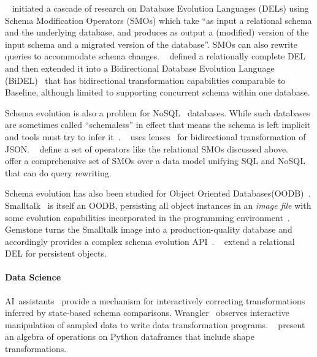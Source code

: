 \documentclass[english,submission]{programming}
\theoremstyle{definition}
\newcommand{\citet}[1]{\citeauthor*{#1}~\cite{#1}}
\begin{document}
\citet{curino08} initiated a cascade of research on Database Evolution Languages (DELs) using Schema Modification Operators (SMOs) which take
 ``as input a relational schema and the underlying database, and produces as output a (modified) version of the input schema and a migrated version of the database''. SMOs can also rewrite queries to accommodate schema changes.
 \citet{herrmann15} defined a relationally complete DEL and then extended it into a Bidirectional Database Evolution Language (BiDEL)~\cite{herrmann17} that has bidirectional transformation capabilities comparable to Baseline, although limited to supporting concurrent schema within one database.

Schema evolution is also a problem for NoSQL~\cite{sadalage12} databases. While such databases are sometimes called ``schemaless'' in effect that means the schema is left implicit and tools must try to infer it~\cite{storl20, storl22}. \citet{Cambria} uses lenses~\cite{Foster2007} for bidirectional transformation of JSON. \citet{scherzinger13} define a set of operators like the relational SMOs discussed above. \citeauthor*{chillon22}~\cite{chillon22, chillon23} offer a comprehensive set of SMOs over a data model unifying SQL and NoSQL that can do query rewriting.

Schema evolution has also been studied for Object Oriented Databases(OODB)~\cite{li99, banerjee87}. Smalltalk~\cite{Goldberg80} is itself an OODB, persisting all object instances in an \textit{image file} with some evolution capabilities incorporated in the programming environment~\cite[pp.252-272]{Goldberg80}. Gemstone turns the Smalltalk image into a production-quality database and accordingly provides a complex schema evolution API~\cite{Gemstone}. \citet{kamina25} extend a relational DEL for persistent objects.

\paragraph{Data Science}
AI~assistants~\cite{AIassistants} provide a mechanism for interactively correcting
transformations inferred by state-based schema comparisons.
Wrangler~\cite{kandel11} observes interactive manipulation of sampled data to write data transformation programs.
\citet{petersohn20} present an algebra of operations on Python dataframes that include shape transformations.
\end{document}
